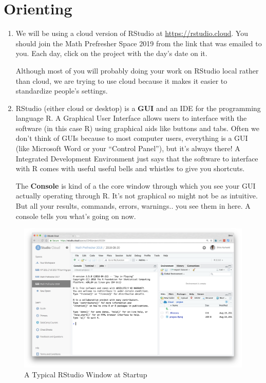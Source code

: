\documentclass[
]{book}
\theoremstyle{definition}
\theoremstyle{definition}
\theoremstyle{definition}
\theoremstyle{remark}
\begin{document}
\hypertarget{orienting}{%
\section{Orienting}\label{orienting}}

\begin{enumerate}
\def\labelenumi{\arabic{enumi}.}
\item
  We will be using a cloud version of RStudio at \url{https://rstudio.cloud}. You should join the Math Prefresher Space 2019 from the link that was emailed to you. Each day, click on the project with the day's date on it.

  Although most of you will probably doing your work on RStudio local rather than cloud, we are trying to use cloud because it makes it easier to standardize people's settings.
\item
  RStudio (either cloud or desktop) is a \textbf{GUI} and an IDE for the programming language R. A Graphical User Interface allows users to interface with the software (in this case R) using graphical aids like buttons and tabs. Often we don't think of GUIs because to most computer users, everything is a GUI (like Microsoft Word or your ``Control Panel''), but it's always there! A Integrated Development Environment just says that the software to interface with R comes with useful useful bells and whistles to give you shortcuts.

  The \textbf{Console} is kind of a the core window through which you see your GUI actually operating through R. It's not graphical so might not be as intuitive. But all your results, commands, errors, warnings.. you see them in here. A console tells you what's going on now.
\end{enumerate}

\begin{figure}
\centering
\includegraphics{images/11_1_rstudio-startup.png}
\caption{A Typical RStudio Window at Startup}
\end{figure}
\end{document}
